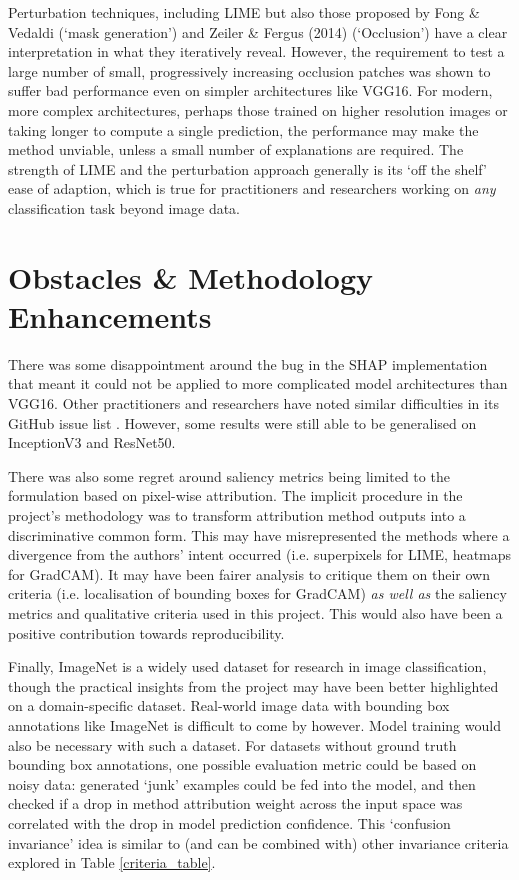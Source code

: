\documentclass[main]{subfiles}
\begin{document}
Perturbation techniques, including LIME but also those proposed by Fong \& Vedaldi \cite{perturb_fong} (`mask generation') and Zeiler \& Fergus (2014) \cite{zeilerfergus2013} (`Occlusion') have a clear interpretation in what they iteratively reveal. However, the requirement to test a large number of small, progressively increasing occlusion patches was shown to suffer bad performance even on simpler architectures like VGG16. For modern, more complex architectures, perhaps those trained on higher resolution images or taking longer to compute a single prediction, the performance may make the method unviable, unless a small number of explanations are required. The strength of LIME and the perturbation approach generally is its `off the shelf' ease of adaption, which is true for practitioners and researchers working on \textit{any} classification task beyond image data.

\section{Obstacles \& Methodology Enhancements}

There was some disappointment around the bug in the SHAP implementation that meant it could not be applied to more complicated model architectures than VGG16. Other practitioners and researchers have noted similar difficulties in its GitHub issue list \cite{shaprepo}. However, some results were still able to be generalised on InceptionV3 and ResNet50.

There was also some regret around saliency metrics being limited to the formulation based on pixel-wise attribution. The implicit procedure in the project's methodology was to transform attribution method outputs into a discriminative common form. This may have misrepresented the methods where a divergence from the authors' intent occurred (i.e. superpixels for LIME, heatmaps for GradCAM). It may have been fairer analysis to critique them on their own criteria (i.e. localisation of bounding boxes for GradCAM) \textit{as well as} the saliency metrics and qualitative criteria used in this project. This would also have been a positive contribution towards reproducibility.

Finally, ImageNet is a widely used dataset for research in image classification, though the practical insights from the project may have been better highlighted on a domain-specific dataset. Real-world image data with bounding box annotations like ImageNet is difficult to come by however. Model training would also be necessary with such a dataset. For datasets without ground truth bounding box annotations, one possible evaluation metric could be based on noisy data: generated `junk' examples could be fed into the model, and then checked if a drop in method attribution weight across the input space was correlated with the drop in model prediction confidence. This `confusion invariance' idea is similar to (and can be combined with) other invariance criteria explored in Table \ref{criteria_table}.
\end{document}
